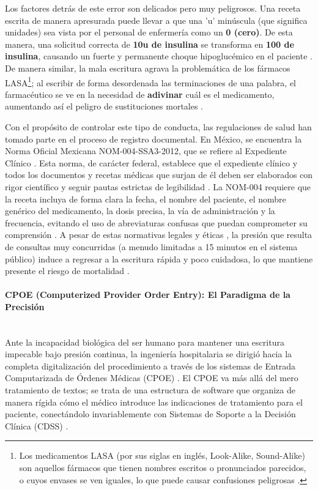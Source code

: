 Los factores detrás de este error son delicados pero muy peligrosos. Una receta escrita de manera apresurada puede llevar a que una 'u' minúscula (que significa unidades) sea vista por el personal de enfermería como un \textbf{0 (cero)}. De esta manera, una solicitud correcta de \textbf{10u de insulina} se transforma en \textbf{100 de insulina}, causando un fuerte y permanente choque hipoglucémico en el paciente \cite{leapfrog2023cpoe}. De manera similar, la mala escritura agrava la problemática de los fármacos LASA\footnote{Los medicamentos LASA (por sus siglas en inglés, Look-Alike, Sound-Alike) son aquellos fármacos que tienen nombres escritos o pronunciados parecidos, o cuyos envases se ven iguales, lo que puede causar confusiones peligrosas \cite{saludcdmx2018lasa}.}; al escribir de forma desordenada las terminaciones de una palabra, el farmacéutico se ve en la necesidad de \textbf{adivinar} cuál es el medicamento, aumentando así el peligro de sustituciones mortales \cite{healthwise_handwriting_errors}.

Con el propósito de controlar este tipo de conducta, las regulaciones de salud han tomado parte en el proceso de registro documental. En México, se encuentra la Norma Oficial Mexicana NOM-004-SSA3-2012, que se refiere al Expediente Clínico \cite{dricloud_nom004}. Esta norma, de carácter federal, establece que el expediente clínico y todos los documentos y recetas médicas que surjan de él deben ser elaborados con rigor científico y seguir pautas estrictas de legibilidad \cite{dricloud_nom004}. La NOM-004 requiere que la receta incluya de forma clara la fecha, el nombre del paciente, el nombre genérico del medicamento, la dosis precisa, la vía de administración y la frecuencia, evitando el uso de abreviaturas confusas que puedan comprometer su comprensión \cite{saludtotal_checklist_nom004}. A pesar de estas normativas legales y éticas \cite{conamed_nom004}, la presión que resulta de consultas muy concurridas (a menudo limitadas a 15 minutos en el sistema público) induce a regresar a la escritura rápida y poco cuidadosa, lo que mantiene presente el riesgo de mortalidad \cite{saludtotal2026receta_electronica}.

\paragraph{CPOE (Computerized Provider Order Entry): El Paradigma de la Precisión} \leavevmode \\

Ante la incapacidad biológica del ser humano para mantener una escritura impecable bajo presión continua, la ingeniería hospitalaria se dirigió hacia la completa digitalización del procedimiento a través de los sistemas de Entrada Computarizada de Órdenes Médicas (CPOE) \cite{leapfrog2023cpoe}. El CPOE va más allá del mero tratamiento de textos; se trata de una estructura de software que organiza de manera rígida cómo el médico introduce las indicaciones de tratamiento para el paciente, conectándolo invariablemente con Sistemas de Soporte a la Decisión Clínica (CDSS) \cite{ahrq_cpoe_primer}.

